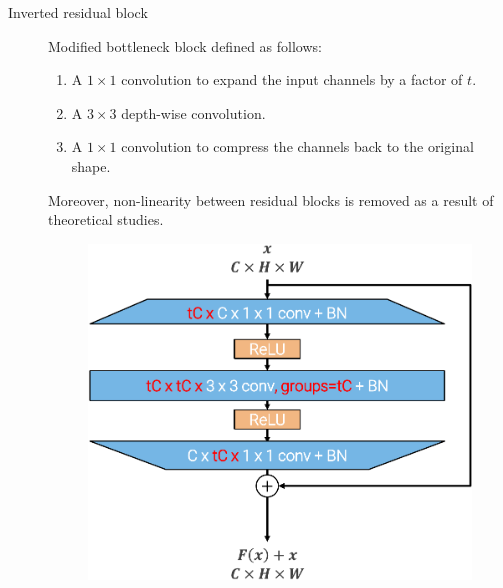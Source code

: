 \begin{description}
    \item[Inverted residual block] 
        Modified bottleneck block defined as follows:
        \begin{enumerate}
            \item A $1 \times 1$ convolution to expand the input channels by a factor of $t$. 
            \item A $3 \times 3$ depth-wise convolution.
            \item A $1 \times 1$ convolution to compress the channels back to the original shape.
        \end{enumerate}
        Moreover, non-linearity between residual blocks is removed as a result of theoretical studies.

        \begin{figure}[H]
            \centering
            \includegraphics[width=0.4\linewidth]{./img/_inverted_residual.pdf}
        \end{figure}
\end{description}

